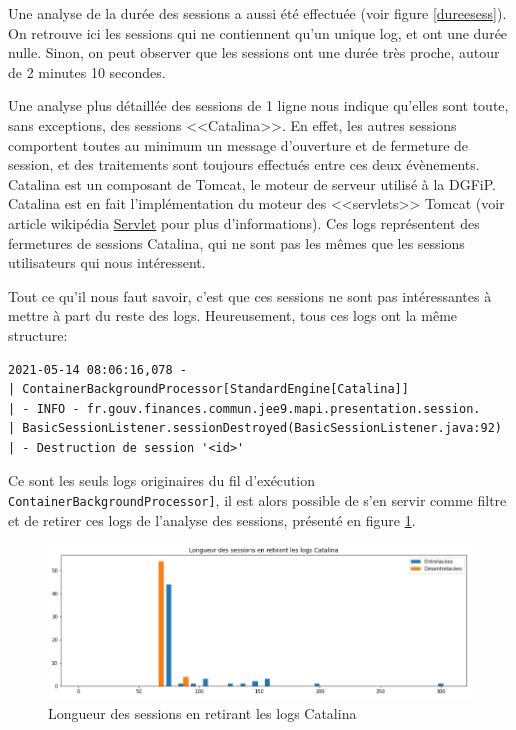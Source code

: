 \documentclass[openany, 11pt]{memoir}
\begin{document}
Une analyse de la durée des sessions a aussi été effectuée (voir figure \ref{dureesess}). On retrouve ici les sessions qui ne contiennent qu'un unique \gls{log}, et ont une durée nulle. Sinon, on peut observer que les sessions ont une durée très proche, autour de 2 minutes 10 secondes.

\bigskip
Une analyse plus détaillée des sessions de 1 ligne nous indique qu'elles sont toute, sans exceptions, des sessions <<Catalina>>. En effet, les autres sessions comportent toutes au minimum un message d'ouverture et de fermeture de session, et des traitements sont toujours effectués entre ces deux évènements. Catalina est un composant de Tomcat, le moteur de serveur utilisé à la DGFiP. Catalina est en fait l'implémentation du moteur des <<servlets>> Tomcat (voir article wikipédia \href{https://fr.wikipedia.org/wiki/Servlet}{Servlet} pour plus d'informations). Ces \glspl{log} représentent des fermetures de sessions Catalina, qui ne sont pas les mêmes que les sessions utilisateurs qui nous intéressent.

Tout ce qu'il nous faut savoir, c'est que ces sessions ne sont pas intéressantes à mettre à part du reste des \glspl{log}. Heureusement, tous ces logs ont la même structure:

\begin{lstlisting}
2021-05-14 08:06:16,078 -
| ContainerBackgroundProcessor[StandardEngine[Catalina]]
| - INFO - fr.gouv.finances.commun.jee9.mapi.presentation.session.
| BasicSessionListener.sessionDestroyed(BasicSessionListener.java:92)
| - Destruction de session '<id>'
\end{lstlisting}

Ce sont les seuls \glspl{log} originaires du fil d'exécution \texttt{ContainerBackgroundProcessor\allowbreak [Stan\-dard\allowbreak Engine[Catalina]]}, il est alors possible de s'en servir comme filtre et de retirer ces logs de l'analyse des sessions, présenté en figure \ref{longsesscata}.

\begin{figure}[ht]
	\centering
	\includegraphics[width=\textwidth]{images/longsesscata.png}
	\caption{Longueur des sessions en retirant les logs Catalina}
	\label{longsesscata}
\end{figure}
\end{document}
